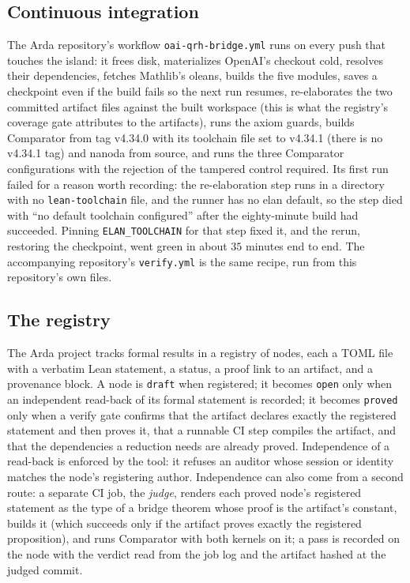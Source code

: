 \documentclass[11pt]{article}
\theoremstyle{definition}
\newcommand{\lean}[1]{\texttt{#1}}
\begin{document}
\subsection{Continuous integration}

The Arda repository's workflow \lean{oai-qrh-bridge.yml} \cite{Arda} runs on every push that touches the island: it frees disk, materializes OpenAI's checkout cold, resolves their dependencies, fetches Mathlib's oleans, builds the five modules, saves a checkpoint even if the build fails so the next run resumes, re-elaborates the two committed artifact files against the built workspace (this is what the registry's coverage gate attributes to the artifacts), runs the axiom guards, builds Comparator from tag v4.34.0 with its toolchain file set to v4.34.1 (there is no v4.34.1 tag) and nanoda from source, and runs the three Comparator configurations with the rejection of the tampered control required. Its first run failed for a reason worth recording: the re-elaboration step runs in a directory with no \lean{lean-toolchain} file, and the runner has no elan default, so the step died with ``no default toolchain configured'' after the eighty-minute build had succeeded. Pinning \lean{ELAN\_TOOLCHAIN} for that step fixed it, and the rerun, restoring the checkpoint, went green in about $35$ minutes end to end. The accompanying repository's \lean{verify.yml} is the same recipe, run from this repository's own files.

\subsection{The registry}\label{sec:registry}

The Arda project tracks formal results in a registry of nodes, each a TOML file with a verbatim Lean statement, a status, a proof link to an artifact, and a provenance block. A node is \lean{draft} when registered; it becomes \lean{open} only when an independent read-back of its formal statement is recorded; it becomes \lean{proved} only when a verify gate confirms that the artifact declares exactly the registered statement and then proves it, that a runnable CI step compiles the artifact, and that the dependencies a reduction needs are already proved. Independence of a read-back is enforced by the tool: it refuses an auditor whose session or identity matches the node's registering author. Independence can also come from a second route: a separate CI job, the \emph{judge}, renders each proved node's registered statement as the type of a bridge theorem whose proof is the artifact's constant, builds it (which succeeds only if the artifact proves exactly the registered proposition), and runs Comparator with both kernels on it; a pass is recorded on the node with the verdict read from the job log and the artifact hashed at the judged commit.
\end{document}
